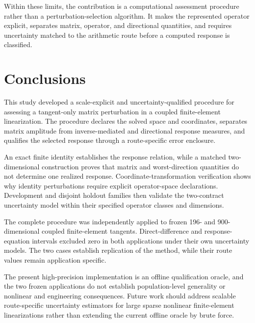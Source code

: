 \documentclass[preprint,12pt]{elsarticle}
\begin{document}
\begin{table}[htbp]
\centering\small
\caption{Interpretation boundary by claim domain. Supplementary Table~S7 retains the complete claim--evidence matrix.}
\label{tab:4}

\end{table}

Within these limits, the contribution is a computational assessment procedure rather than a perturbation-selection algorithm. It makes the represented operator explicit, separates matrix, operator, and directional quantities, and requires uncertainty matched to the arithmetic route before a computed response is classified.

\FloatBarrier

\section{Conclusions}

This study developed a scale-explicit and uncertainty-qualified procedure for assessing a tangent-only matrix perturbation in a coupled finite-element linearization. The procedure declares the solved space and coordinates, separates matrix amplitude from inverse-mediated and directional response measures, and qualifies the selected response through a route-specific error enclosure.

An exact finite identity establishes the response relation, while a matched two-dimensional construction proves that matrix and worst-direction quantities do not determine one realized response. Coordinate-transformation verification shows why identity perturbations require explicit operator-space declarations. Development and disjoint holdout families then validate the two-contract uncertainty model within their specified operator classes and dimensions.

The complete procedure was independently applied to frozen 196- and 900-dimensional coupled finite-element tangents. Direct-difference and response-equation intervals excluded zero in both applications under their own uncertainty models. The two cases establish replication of the method, while their route values remain application specific.

The present high-precision implementation is an offline qualification oracle, and the two frozen applications do not establish population-level generality or nonlinear and engineering consequences. Future work should address scalable route-specific uncertainty estimators for large sparse nonlinear finite-element linearizations rather than extending the current offline oracle by brute force.
\end{document}
